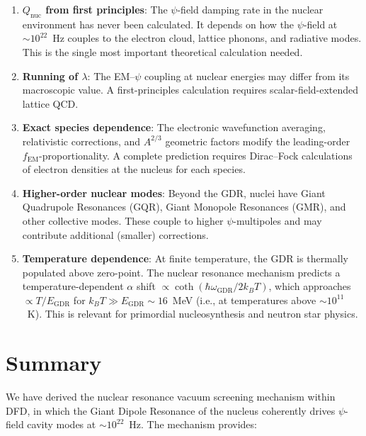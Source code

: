 \documentclass[aps,prd,twocolumn,superscriptaddress,nofootinbib]{revtex4-2}
\newcommand{\lam}{\lambda}
\newcommand{\fEM}{f_{\mathrm{EM}}}
\newcommand{\Qnuc}{Q_{\mathrm{nuc}}}
\newcommand{\wGDR}{\omega_{\mathrm{GDR}}}
\newcommand{\EGDR}{E_{\mathrm{GDR}}}
\begin{document}
\begin{enumerate}[nosep]
\item \textbf{$\Qnuc$ from first principles}: The $\psi$-field
damping rate in the nuclear environment has never been calculated.
It depends on how the $\psi$-field at $\sim\!10^{22}$~Hz couples to
the electron cloud, lattice phonons, and radiative modes.  This is
the single most important theoretical calculation needed.

\item \textbf{Running of $\lam$}: The EM--$\psi$ coupling at nuclear
energies may differ from its macroscopic value.  A first-principles
calculation requires scalar-field-extended lattice QCD.

\item \textbf{Exact species dependence}: The electronic wavefunction
averaging, relativistic corrections, and $A^{2/3}$ geometric factors
modify the leading-order $\fEM$-proportionality.  A complete
prediction requires Dirac--Fock calculations of electron densities at
the nucleus for each species.

\item \textbf{Higher-order nuclear modes}: Beyond the GDR, nuclei
have Giant Quadrupole Resonances (GQR), Giant Monopole Resonances
(GMR), and other collective modes.  These couple to higher
$\psi$-multipoles and may contribute additional (smaller) corrections.

\item \textbf{Temperature dependence}: At finite temperature, the
GDR is thermally populated above zero-point.  The nuclear resonance
mechanism predicts a temperature-dependent $\alpha$ shift
$\propto \coth(\hbar\wGDR/2k_B T)$, which approaches
$\propto T/\EGDR$ for $k_B T \gg \EGDR \sim 16$~MeV
(i.e., at temperatures above $\sim\!10^{11}$~K).  This is relevant
for primordial nucleosynthesis and neutron star physics.
\end{enumerate}


\section{Summary}
\label{sec:summary}

We have derived the nuclear resonance vacuum screening mechanism
within DFD, in which the Giant Dipole Resonance of the nucleus
coherently drives $\psi$-field cavity modes at $\sim\!10^{22}$~Hz.
The mechanism provides:
\end{document}
